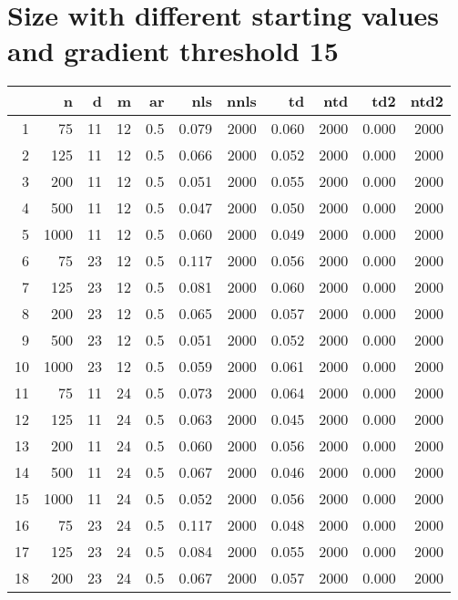 \documentclass{article}
\begin{document}
\section{Size with different starting values and gradient threshold 15}
\begin{tabular}{rrrrrrrrrrr}
  \hline
 & n & d & m & ar & nls & nnls & td & ntd & td2 & ntd2 \\ 
  \hline
1 & 75 & 11 & 12 & 0.5 & 0.079 & 2000 & 0.060 & 2000 & 0.000 & 2000 \\ 
  2 & 125 & 11 & 12 & 0.5 & 0.066 & 2000 & 0.052 & 2000 & 0.000 & 2000 \\ 
  3 & 200 & 11 & 12 & 0.5 & 0.051 & 2000 & 0.055 & 2000 & 0.000 & 2000 \\ 
  4 & 500 & 11 & 12 & 0.5 & 0.047 & 2000 & 0.050 & 2000 & 0.000 & 2000 \\ 
  5 & 1000 & 11 & 12 & 0.5 & 0.060 & 2000 & 0.049 & 2000 & 0.000 & 2000 \\ 
   \hline
6 & 75 & 23 & 12 & 0.5 & 0.117 & 2000 & 0.056 & 2000 & 0.000 & 2000 \\ 
  7 & 125 & 23 & 12 & 0.5 & 0.081 & 2000 & 0.060 & 2000 & 0.000 & 2000 \\ 
  8 & 200 & 23 & 12 & 0.5 & 0.065 & 2000 & 0.057 & 2000 & 0.000 & 2000 \\ 
  9 & 500 & 23 & 12 & 0.5 & 0.051 & 2000 & 0.052 & 2000 & 0.000 & 2000 \\ 
  10 & 1000 & 23 & 12 & 0.5 & 0.059 & 2000 & 0.061 & 2000 & 0.000 & 2000 \\ 
   \hline
11 & 75 & 11 & 24 & 0.5 & 0.073 & 2000 & 0.064 & 2000 & 0.000 & 2000 \\ 
  12 & 125 & 11 & 24 & 0.5 & 0.063 & 2000 & 0.045 & 2000 & 0.000 & 2000 \\ 
  13 & 200 & 11 & 24 & 0.5 & 0.060 & 2000 & 0.056 & 2000 & 0.000 & 2000 \\ 
  14 & 500 & 11 & 24 & 0.5 & 0.067 & 2000 & 0.046 & 2000 & 0.000 & 2000 \\ 
  15 & 1000 & 11 & 24 & 0.5 & 0.052 & 2000 & 0.056 & 2000 & 0.000 & 2000 \\ 
   \hline
16 & 75 & 23 & 24 & 0.5 & 0.117 & 2000 & 0.048 & 2000 & 0.000 & 2000 \\ 
  17 & 125 & 23 & 24 & 0.5 & 0.084 & 2000 & 0.055 & 2000 & 0.000 & 2000 \\ 
  18 & 200 & 23 & 24 & 0.5 & 0.067 & 2000 & 0.057 & 2000 & 0.000 & 2000 \\ 

\end{tabular}
\end{document}
